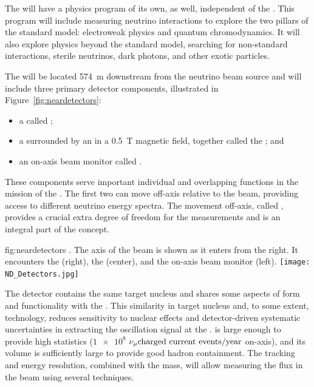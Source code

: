The  will have a physics program of its own, as well, independent of the .  This program will include measuring neutrino interactions to explore the two pillars of the standard model: electroweak physics and quantum chromodynamics. It will also explore physics beyond the standard model, searching for non-standard interactions, sterile neutrinos,  dark photons, and  other exotic particles.

The  will be located \SI{574}{m} downstream from the neutrino beam source and will include three primary detector components, illustrated in Figure~\ref{fig:neardetectors}: 

\begin{itemize}
\item a  called ; 
\item a  surrounded by an  in a \SI{0.5}{T} magnetic field, together called the ; and 
\item an on-axis beam monitor called .
\end{itemize}
These components serve important individual and overlapping functions in the mission of the .  The first two can move off-axis relative to the beam, providing access to different neutrino energy spectra. The movement off-axis, called , provides a crucial extra degree of freedom for the  measurements and is an integral part of the   concept. 

\begin{dunefigure}
{fig:neardetectors}
{ . The axis of the beam is shown as it enters from the right. It encounters
the  (right), the  (center), and the on-axis beam monitor (left).}
\texttt{[image: ND\_Detectors.jpg]}
\end{dunefigure}

The  detector contains the same target nucleus and shares some aspects of form and functionality with the . 
This similarity in target nucleus and, to some extent, technology, reduces sensitivity to nuclear effects and detector-driven systematic uncertainties in extracting the oscillation signal at the  . %
 is large enough to provide high statistics ($\num{1e8}$ ${\nu_\mu \text{charged current events/year}}$ on-axis), and its volume is sufficiently large to provide good hadron containment.  The tracking and energy resolution, combined with the  mass, will allow measuring the flux in the beam using several techniques. %

